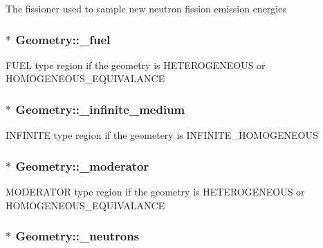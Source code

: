 The fissioner used to sample new neutron fission emission energies \hypertarget{classGeometry_afca54e88b6d937055fc9ca124db1e17e}{
\subsubsection[{\-\_\-fuel}]{$\ast$ Geometry\-::\-\_\-fuel\hspace{0.3cm}{\ttfamily [private]}}}\label{classGeometry_afca54e88b6d937055fc9ca124db1e17e}
F\-U\-E\-L type region if the geometry is H\-E\-T\-E\-R\-O\-G\-E\-N\-E\-O\-U\-S or H\-O\-M\-O\-G\-E\-N\-E\-O\-U\-S\-\_\-\-E\-Q\-U\-I\-V\-A\-L\-A\-N\-C\-E \hypertarget{classGeometry_aad96c277327aa2fb1f512f4678af94f0}{
\subsubsection[{\-\_\-infinite\-\_\-medium}]{$\ast$ Geometry\-::\-\_\-infinite\-\_\-medium\hspace{0.3cm}{\ttfamily [private]}}}\label{classGeometry_aad96c277327aa2fb1f512f4678af94f0}
I\-N\-F\-I\-N\-I\-T\-E type region if the geometery is I\-N\-F\-I\-N\-I\-T\-E\-\_\-\-H\-O\-M\-O\-G\-E\-N\-E\-O\-U\-S \hypertarget{classGeometry_a023855a68edb163698d88da928935c4b}{
\subsubsection[{\-\_\-moderator}]{$\ast$ Geometry\-::\-\_\-moderator\hspace{0.3cm}{\ttfamily [private]}}}\label{classGeometry_a023855a68edb163698d88da928935c4b}
M\-O\-D\-E\-R\-A\-T\-O\-R type region if the geometry is H\-E\-T\-E\-R\-O\-G\-E\-N\-E\-O\-U\-S or H\-O\-M\-O\-G\-E\-N\-E\-O\-U\-S\-\_\-\-E\-Q\-U\-I\-V\-A\-L\-A\-N\-C\-E \hypertarget{classGeometry_aae2651151b89d9b82c434eaa83edc477}{
\subsubsection[{\-\_\-neutrons}]{$\ast$ Geometry\-::\-\_\-neutrons\hspace{0.3cm}{\ttfamily [private]}}}\label{classGeometry_aae2651151b89d9b82c434eaa83edc477}
